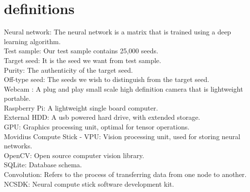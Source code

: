 \section{definitions}
Neural network: The neural network is a matrix that is trained using a deep learning algorithm. \\
Test sample: Our test sample contains 25,000 seeds. \\
Target seed: It is the seed we want from test sample. \\
Purity: The authenticity of the target seed. \\
Off-type seed: The seeds we wish to distinguish from the target seed. \\
Webcam : A plug and play small scale high definition camera that is lightweight portable. \\
Raspberry Pi: A lightweight single board computer. \\
External HDD: A usb powered hard drive, with extended storage. \\
GPU: Graphics processing unit, optimal for tensor operations. \\
Movidius Compute Stick - VPU: Vision processing unit, used for storing neural networks.\\
OpenCV: Open source computer vision library. \\
SQLite: Database schema. \\
Convolution: Refers to the process of transferring data from one node to another. \\
NCSDK: Neural compute stick software development kit. \\
